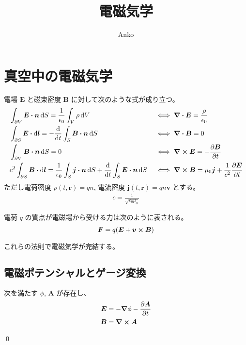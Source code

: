 \documentclass[uplatex,dvipdfmx,a4paper,11pt]{jlreq}
\title{電磁気学}
\author{Anko}
\makeatletter
\newcommand{\EE}{\bm{E}}
\newcommand{\BB}{\bm{B}}
\renewcommand{\AA}{\bm{A}}
\newcommand{\rr}{\bm{r}}
\theoremstyle{definition}
\renewenvironment{proof}[1][\proofname]{\par
  \normalfont
  \topsep6\p@\@plus6\p@ \trivlist
  \item[\hskip\labelsep{\bfseries #1}\@addpunct{\bfseries}]\ignorespaces\quad\par
}{%
  \qed\endtrivlist\@endpefalse
}
\renewcommand\proofname{証明}
\makeatother
\begin{document}
\maketitle

\section{真空中の電磁気学}
\begin{definition}
  電場 $\EE$ と磁束密度 $\BB$ に対して次のような式が成り立つ。
  \begin{align}
     & \int_{\partial V}\EE\vdot\bm{n}\dd{S} = \frac{1}{\epsilon_0}\int_V\rho\dd{V}                                                   &  & \iff \vnabla\vdot\EE  = \frac{\rho}{\epsilon_0}                                \\
     & \int_{\partial S}\EE\vdot\dd{\bm{l}} = -\dv{t}\int_S\BB\vdot\bm{n}\dd{S}                                                       &  & \iff \vnabla\vdot\BB  = 0                                                      \\
     & \int_{\partial V}\BB\vdot\bm{n}\dd{S} = 0                                                                                      &  & \iff \vnabla\cross\EE = -\pdv{\BB}{t}                                          \\
     & c^2\int_{\partial S}\BB\vdot\dd{\bm{l}} = \frac{1}{\epsilon_0}\int_S\bm{j}\vdot\bm{n}\dd{S} + \dv{t}\int_S\EE\vdot\bm{n}\dd{S} &  & \iff \vnabla\cross\BB = \mu_0\bm{j} + \frac{1}{c^2}\pdv{\EE}{t} \label{Ampere}
  \end{align}
  ただし電荷密度 $\rho(t, \rr) = qn$, 電流密度 $\bm{j}(t, \rr) = qn\bm{v}$ とする。
  \begin{align}
    c = \frac{1}{\sqrt{\varepsilon_0\mu_0}}
  \end{align}
\end{definition}
\begin{definition}[Lorentz 力]
  電荷 $q$ の質点が電磁場から受ける力は次のように表される。
  \begin{align}
    \bm{F} = q(\EE + \bm{v}\cross\BB)
  \end{align}
\end{definition}
これらの法則で電磁気学が完結する。

\subsection{電磁ポテンシャルとゲージ変換}
\begin{theorem}[電位とベクトルポテンシャル]
  次を満たす $\phi$, $\AA$ が存在し、
  \begin{align}
    \EE & = - \vnabla\phi - \pdv{\AA}{t} \\
    \BB & = \vnabla\cross\AA
  \end{align}
\end{theorem}
\begin{proof}
\end{proof}
\end{document}
